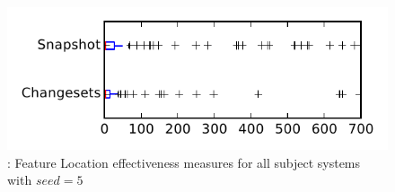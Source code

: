 
\begin{figure}
\centering
\includegraphics[height=0.4\textheight]{figures/flt_seed/rq1_tiny_5}
\caption{\rone: Feature Location effectiveness measures for all subject systems with $seed=5$}
\label{fig:flt_seed:rq1:tiny}
\end{figure}
